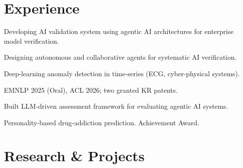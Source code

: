 \documentclass[]{deedy-resume-openfont}
\begin{document}
\begin{minipage}[t]{0.66\textwidth}

\section{Experience}

\vspace{0.4em}
\begin{tightemize}
\item Developing AI validation system using agentic AI architectures for enterprise model verification.
\item Designing autonomous and collaborative agents for systematic AI verification.
\end{tightemize}
\sectionsep

\vspace{0.4em}
\begin{tightemize}
\item Deep-learning anomaly detection in time-series (ECG, cyber-physical systems).
\item EMNLP 2025 (Oral), ACL 2026; two granted KR patents.
\end{tightemize}
\sectionsep

\vspace{0.4em}
\begin{tightemize}
\item Built LLM-driven assessment framework for evaluating agentic AI systems.
\end{tightemize}
\sectionsep

\vspace{0.4em}
\begin{tightemize}
\item Personality-based drug-addiction prediction. Achievement Award.
\end{tightemize}
\sectionsep

\section{Research \& Projects}


\end{minipage}
\end{document}
